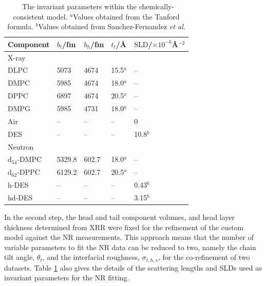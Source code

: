 \documentclass[twoside,twocolumn,9pt]{article}
\begin{document}
%
\begin{table}[h]
	\small
	\caption{\ The invariant parameters within the chemically-consistent model.
	$^a$Values obtained from the Tanford formula.\cite{Tanford1980} $^b$Values obtained from Sanchez-Fernandez \emph{et al.}\cite{Sanchez-Fernandez2016}}
	\label{tab:invariant}
	\begin{tabular*}{0.48\textwidth}{@{\extracolsep{\fill}}lllll}
		\hline
		Component & $b_t$/fm & $b_h$/fm & $t_t$/\AA & $\text{SLD}$/$\times10^{-6}$\AA$^{-2}$ \\
		\hline
		X-ray & & & & \\
		DLPC & 5073 & 4674 & 15.5$^a$ & -- \\
		DMPC & 5985 & 4674 & 18.0$^a$ & -- \\
		DPPC & 6897 & 4674 & 20.5$^a$ & -- \\
		DMPG & 5985 & 4731 & 18.0$^a$ & --\\
		Air & -- & -- & -- & 0\\
		DES & -- & -- & -- & 10.8$^b$ \\
		\hline
		Neutron & & & & \\
		d$_{54}$-DMPC & 5329.8 & 602.7 & 18.0$^a$ & -- \\
		d$_{62}$-DPPC & 6129.2 & 602.7 & 20.5$^a$ & -- \\
		h-DES & -- & -- & -- & 0.43$^b$  \\
		hd-DES & -- & -- & -- & 3.15$^b$ \\
		\hline
	\end{tabular*}
\end{table}
%
In the second step, the head and tail component volumes, and head layer thickness determined from XRR were fixed for the refinement of the custom model against the NR measurements. This approach means that the number of variable parameters to fit the NR data can be reduced to two, namely the chain tilt angle, $\theta_t$, and the interfacial roughness, $\sigma_{t,h,s}$, for the co-refinement of two datasets. Table \ref{tab:invariant} also gives the details of the scattering lengths and SLDs used as invariant parameters for the NR fitting.
\end{document}
